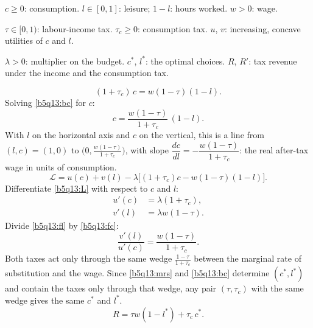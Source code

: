 \begin{sol}
\begin{notacao}
\item $c\ge0$: consumption. $l\in[0,1]$: leisure; $1-l$: hours worked. $w>0$: wage.
\item $\tau\in[0,1)$: labour-income tax. $\tau_c\ge0$: consumption tax. $u$, $v$: increasing, concave utilities of $c$ and $l$.
\item $\lambda>0$: multiplier on the budget. $c^*$, $l^*$: the optimal choices. $R$, $R'$: tax revenue under the income and the consumption tax.
\end{notacao}
\begin{equation}
(1+\tau_c)\,c=w(1-\tau)(1-l). \label{b5q13:bc}
\end{equation}
Solving \eqref{b5q13:bc} for $c$:
\[
c=\frac{w(1-\tau)}{1+\tau_c}\,(1-l).
\]
With $l$ on the horizontal axis and $c$ on the vertical, this is a line from $(l,c)=(1,0)$ to $\big(0,\frac{w(1-\tau)}{1+\tau_c}\big)$, with slope
$\dfrac{dc}{dl}=-\dfrac{w(1-\tau)}{1+\tau_c}$: the real after-tax wage in units of consumption.
\begin{equation}
\mathcal L=u(c)+v(l)-\lambda\big[(1+\tau_c)c-w(1-\tau)(1-l)\big]. \label{b5q13:L}
\end{equation}
Differentiate \eqref{b5q13:L} with respect to $c$ and $l$:
\begin{align}
u'(c)&=\lambda(1+\tau_c), \label{b5q13:fc}\\
v'(l)&=\lambda w(1-\tau). \label{b5q13:fl}
\end{align}
Divide \eqref{b5q13:fl} by \eqref{b5q13:fc}:
\begin{equation}
\frac{v'(l)}{u'(c)}=\frac{w(1-\tau)}{1+\tau_c}. \label{b5q13:mrs}
\end{equation}
Both taxes act only through the same wedge $\frac{1-\tau}{1+\tau_c}$ between the marginal rate of substitution and the wage. Since
\eqref{b5q13:mrs} and \eqref{b5q13:bc} determine $(c^*,l^*)$ and contain the taxes only through that wedge, any pair $(\tau,\tau_c)$ with the
same wedge gives the same $c^*$ and $l^*$.
\begin{equation}
R=\tau w(1-l^*)+\tau_c\,c^*. \label{b5q13:R}
\end{equation}

\end{sol}
